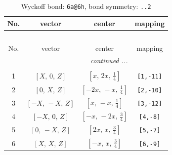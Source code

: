 \documentclass[fleqn,8pt]{jsarticle}
\begin{document}
\renewcommand{\arraystretch}{1.2}
\begin{longtable}{cccc}
\caption{Wyckoff bond: {\tt 6a@6h}, bond symmetry: {\tt ..2}}
 \\
 \hline \hline
No. & vector & center & mapping \\ \hline \endfirsthead

\multicolumn{3}{l}{\tablename\ \thetable{}} \\
 \hline \hline
No. & vector & center & mapping \\ \hline \endhead

 \hline \hline
\multicolumn{3}{r}{\footnotesize\it continued ...} \\ \endfoot

 \hline \hline
\multicolumn{3}{r}{} \\ \endlastfoot

1 & $\left[ X,\, 0,\, Z \right]$ & $\left[ x,\, 2 x,\, \frac{1}{4} \right]$ & {\tt [1,-11]} \\ \hline
2 & $\left[ 0,\, X,\, Z \right]$ & $\left[ - 2 x,\, - x,\, \frac{1}{4} \right]$ & {\tt [2,-10]} \\ \hline
3 & $\left[ - X,\, - X,\, Z \right]$ & $\left[ x,\, - x,\, \frac{1}{4} \right]$ & {\tt [3,-12]} \\ \hline
4 & $\left[ - X,\, 0,\, Z \right]$ & $\left[ - x,\, - 2 x,\, \frac{3}{4} \right]$ & {\tt [4,-8]} \\ \hline
5 & $\left[ 0,\, - X,\, Z \right]$ & $\left[ 2 x,\, x,\, \frac{3}{4} \right]$ & {\tt [5,-7]} \\ \hline
6 & $\left[ X,\, X,\, Z \right]$ & $\left[ - x,\, x,\, \frac{3}{4} \right]$ & {\tt [6,-9]} \\
\end{longtable}
\renewcommand{\arraystretch}{1.2}
\end{document}
